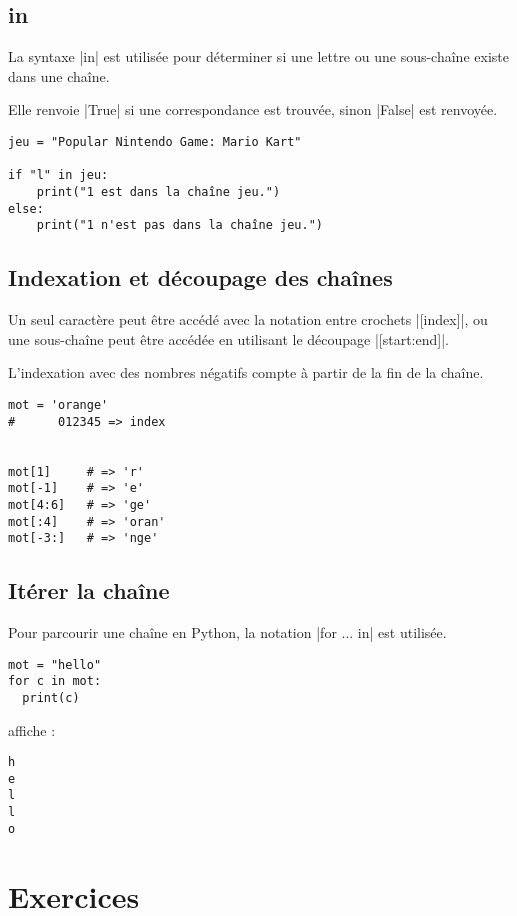\documentclass[11pt, a4paper]{book}
\begin{document}
\subsection{in}
La syntaxe |in| est utilisée pour déterminer si une lettre ou une sous-chaîne existe dans une chaîne. 

Elle renvoie |True| si une correspondance est trouvée, sinon |False| est renvoyée.


\begin{lstlisting}
jeu = "Popular Nintendo Game: Mario Kart"

if "l" in jeu:
    print("1 est dans la chaîne jeu.")
else:
    print("1 n'est pas dans la chaîne jeu.")
\end{lstlisting}


\subsection{Indexation et découpage des chaînes}
Un seul caractère peut être accédé avec la notation entre crochets |[index]|, ou une sous-chaîne peut être accédée en utilisant le découpage |[start:end]|.

L'indexation avec des nombres négatifs compte à partir de la fin de la chaîne.



\begin{lstlisting}
mot = 'orange'
#      012345 => index


mot[1]     # => 'r'
mot[-1]    # => 'e'
mot[4:6]   # => 'ge'
mot[:4]    # => 'oran'
mot[-3:]   # => 'nge'
\end{lstlisting}


\subsection{Itérer la chaîne}
Pour parcourir une chaîne en Python, la notation |for ... in| est utilisée.



\begin{lstlisting}
mot = "hello"
for c in mot:
  print(c)
\end{lstlisting}
affiche : 
\begin{lstlisting}
h
e
l
l
o
\end{lstlisting}


\section{Exercices}
\end{document}
